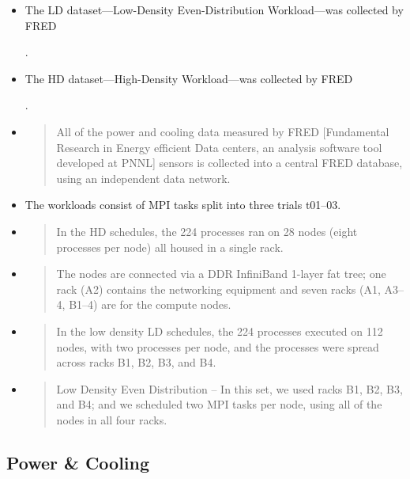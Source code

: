   \begin{itemize}

 \item The LD dataset---Low-Density Even-Distribution Workload---was collected by FRED \date{2011-05-05}.
  \item The HD dataset---High-Density Workload---was collected by FRED \date{2011-04-25}.
  \item  \begin{quote}
      All of the power and cooling data measured by FRED [Fundamental Research in Energy efficient Data centers, an analysis software tool developed at PNNL] sensors is collected into a central FRED database, using an independent data network.    
    \end{quote}

  \item The workloads consist of MPI tasks split into three trials t01--03.
  \item   
    \begin{quote}
      In the HD schedules, the 224 processes ran on 28 nodes (eight processes per node) all housed in a single rack.
    \end{quote}
\item
   \begin{quote}
     The nodes are connected via a DDR InfiniBand 1-layer fat tree; one rack (A2) contains the networking equipment and seven racks (A1, A3--4, B1--4) are for the compute nodes.
   \end{quote}

 \item
\begin{quote}
In the low density LD schedules, the 224 processes executed on 112 nodes, with two processes per node, and the processes were spread across racks B1, B2, B3, and B4.
 \end{quote}  
 \item
 \begin{quote}
Low Density Even Distribution -- In this set, we used
racks B1, B2, B3, and B4; and we scheduled two MPI
tasks per node, using all of the nodes in all four racks.
 \end{quote}

     \end{itemize}


 \subsection*{Power \& Cooling}

